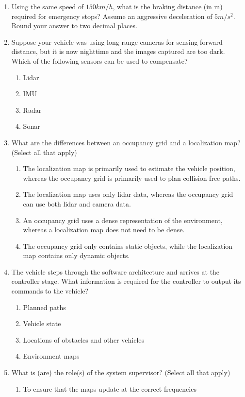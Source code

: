 \begin{enumerate}
\item Using the same speed of $150km/h$, what is the braking distance (in m) required for emergency stops? 
	  Assume an aggressive deceleration of $5m/s^2$. Round your answer to two decimal places.
\item Suppose your vehicle was using long range cameras for sensing forward distance, 
	but it is now nighttime and the images captured are too dark. Which of the following sensors can be used to compensate?
	\begin{enumerate}
		\item Lidar
		\item IMU
		\item Radar
		\item Sonar
	\end{enumerate}
\item What are the differences between an occupancy grid and a localization map? (Select all that apply)
	\begin{enumerate}
		\item The localization map is primarily used to estimate the vehicle position, whereas the occupancy grid is primarily used to plan collision free paths.
		\item The localization map uses only lidar data, whereas the occupancy grid can use both lidar and camera data.
		\item An occupancy grid uses a dense representation of the environment, whereas a localization map does not need to be dense.
		\item The occupancy grid only contains static objects, while the localization map contains only dynamic objects.
	\end{enumerate}
\item The vehicle steps through the software architecture and arrives at the controller stage. 
		What information is required for the controller to output its commands to the vehicle?
		\begin{enumerate}
			\item Planned paths
			\item Vehicle state
			\item Locations of obstacles and other vehicles
			\item Environment maps
		\end{enumerate}
\item What is (are) the role(s) of the system supervisor? (Select all that apply)
	\begin{enumerate}
		\item To ensure that the maps update at the correct frequencies

\end{enumerate}
\end{enumerate}
